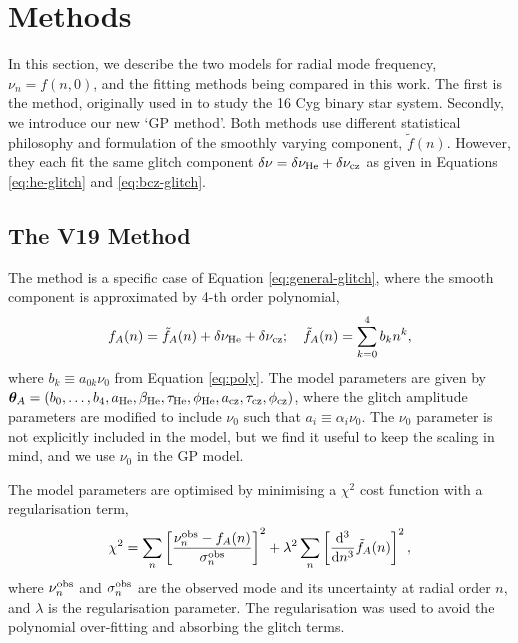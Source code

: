 \section{Methods}\label{sec:glitch-methods}

In this section, we describe the two models for radial mode frequency, \(\nu_n = f(n, 0)\), and the fitting methods being compared in this work. The first is the  method, originally used in \citet{Verma.Faria.ea2014} to study the 16 Cyg binary star system. Secondly, we introduce our new `GP method'. Both methods use different statistical philosophy and formulation of the smoothly varying component, \(\tilde{f}(n)\). However, they each fit the same glitch component \(\delta\nu = \delta\nu_{{\mathrm{He}}} + \delta\nu_{{\mathrm{cz}}}\) as given in Equations \ref{eq:he-glitch} and \ref{eq:bcz-glitch}.

\subsection{The V19 Method}

The  method is a specific case of Equation \ref{eq:general-glitch}, where the smooth component is approximated by 4-th order polynomial,
%
\begin{equation}
    f_A(n) = \tilde{f}_A(n) + \delta\nu_{{\mathrm{He}}} + \delta\nu_{{\mathrm{cz}}}; \quad \tilde{f}_A(n) = \sum_{k=0}^{4} b_k n^k,
\end{equation}
%
\sloppy where \(b_k \equiv a_{0k} \nu_0\) from Equation \ref{eq:poly}. The model parameters are given by \(\bm{\theta}_A = (b_0, \dots, b_4, a_{{\mathrm{He}}}, \beta_{{\mathrm{He}}}, \tau_{{\mathrm{He}}}, \phi_{{\mathrm{He}}}, a_{{\mathrm{cz}}}, \tau_{{\mathrm{cz}}}, \phi_{{\mathrm{cz}}})\), where the glitch amplitude parameters are modified to include \(\nu_0\) such that \(a_i \equiv \alpha_i\nu_0\). The \(\nu_0\) parameter is not explicitly included in the  model, but we find it useful to keep the scaling in mind, and we use \(\nu_0\) in the GP model. 

The model parameters are optimised by minimising a \(\chi^2\) cost function with a regularisation term,
%
\begin{equation}
    \chi^2 = \sum_n \left[ \frac{\nu_n^{{\mathrm{obs}}} - f_{A}(n)}{\sigma_n^{{\mathrm{obs}}}} \right]^2 + \lambda^2 \sum_n \left[ \frac{\mathrm{d}^3}{\mathrm{d} n^3} \tilde{f}_A(n)\right]^2,
\end{equation}
%
where \(\nu_n^{{\mathrm{obs}}}\) and \(\sigma_n^{{\mathrm{obs}}}\) are the observed mode and its uncertainty at radial order \(n\), and \(\lambda\) is the regularisation parameter. The regularisation was used to avoid the polynomial over-fitting and absorbing the glitch terms.

